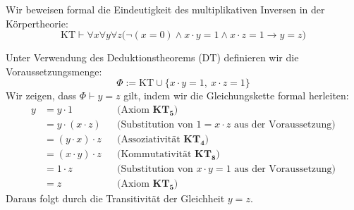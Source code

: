 \begin{math-stroke}
Wir beweisen formal die Eindeutigkeit des multiplikativen Inversen in der Körpertheorie:
\[ \text{KT} \vdash \forall x \forall y \forall z \bigl(\neg(x = 0) \wedge x \cdot y = 1 \wedge x \cdot z = 1 \rightarrow y = z\bigr) \]

\begin{short-proof}
Unter Verwendung des Deduktionstheorems ($\text{DT}$) definieren wir die Voraussetzungsmenge:
\[ \Phi := \text{KT} \cup \{x \cdot y = 1, \ x \cdot z = 1\} \]
Wir zeigen, dass $\Phi \vdash y = z$ gilt, indem wir die Gleichungskette formal herleiten:
\begin{align*}
y &= y \cdot 1 && \text{(Axiom $\mathbf{KT_5}$)} \\
&= y \cdot (x \cdot z) && \text{(Substitution von $1 = x \cdot z$ aus der Voraussetzung)} \\
&= (y \cdot x) \cdot z && \text{(Assoziativität $\mathbf{KT_4}$)} \\
&= (x \cdot y) \cdot z && \text{(Kommutativität $\mathbf{KT_8}$)} \\
&= 1 \cdot z && \text{(Substitution von $x \cdot y = 1$ aus der Voraussetzung)} \\
&= z && \text{(Axiom $\mathbf{KT_5}$)}
\end{align*}
Daraus folgt durch die Transitivität der Gleichheit $y = z$.
\end{short-proof}
\end{math-stroke}

